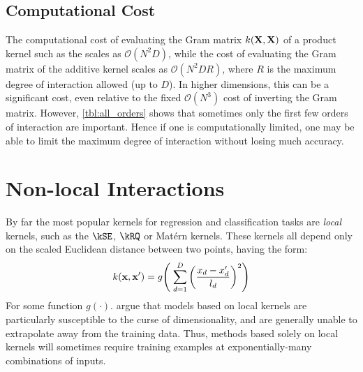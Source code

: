 

\subsection{Computational Cost}
The computational cost of evaluating the Gram matrix $k(\mathbf{X}, \mathbf{X})$ of a product kernel such as the \seard{} scales as $\mathcal{O}(N^2D)$, while the cost of evaluating the Gram matrix of the additive kernel scales as $\mathcal{O}(N^2DR)$, where $R$ is the maximum degree of interaction allowed (up to $D$).
In higher dimensions, this can be a significant cost, even relative to the fixed $\mathcal{O}(N^3)$ cost of inverting the Gram matrix.
However, \cref{tbl:all_orders} shows that sometimes only the first few orders of interaction are important.
Hence if one is computationally limited, one may be able to limit the maximum degree of interaction without losing much accuracy.



\section{Non-local Interactions}
%
By far the most popular kernels for regression and classification tasks are \emph{local} kernels, such as the $\kSE$, $\kRQ$ or Mat\'{e}rn kernels.
These kernels all depend only on the scaled Euclidean distance between two points, having the form:
\begin{align}
k({\bf x, x'}) = g \!\left( \; \sum_{d=1}^D \left( \frac{  x_{d} - x_{d}' }{ l_d } \right)^2 \right)
\end{align}
For some function $g(\cdot)$.
\citet{bengio2006curse} argue that models based on local kernels are particularly susceptible to the curse of dimensionality, and are generally unable to extrapolate away from the training data.
Thus, methods based solely on local kernels will sometimes require training examples at exponentially-many combinations of inputs.

